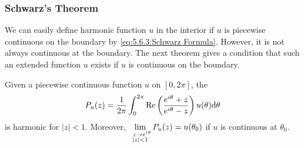 \subsubsection{Schwarz's Theorem}
We can easily define harmonic function $ u $ in the interior if  $ u  $ is piecewise continuous on the boundary by \eqref{eq:5.6.3:Schwarz Formula}. However, it is not always continuous at the boundary. The next theorem gives a condition that such an extended function $ u $ exists if  $ u  $ is continuous on the boundary.  
\begin{theorem}\label{thm:5.6.4:Schwarz's theorem}
    Given a piecewise continuous function  $ u  $ on  $ [0,2\pi] $, the 
    \begin{equation}
        P_u(z)=\frac{1}{2\pi }\int_0^{2\pi}\mathrm{Re}\left(\frac{e^{i\theta}+z}{e^{i\theta}-z}\right)u(\theta)\mathrm{d}\theta
    \end{equation} 
    is harmonic for  $ |z|<1 $. Moreover,  $ \displaystyle\lim_{\substack{\,\,\,z\to e^{i\theta}\\|z|<1}} P_u(z)=u(\theta_0)$  if  $ u $ is continuous at  $ \theta_0 $.   
\end{theorem}
